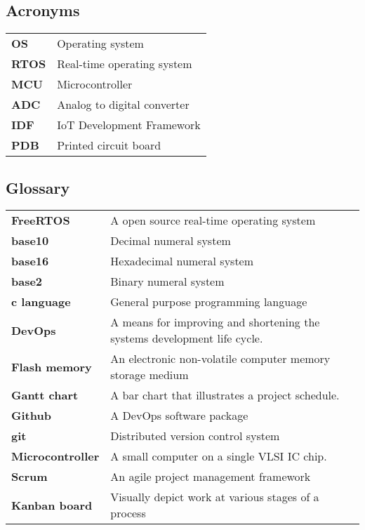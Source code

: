 \documentclass[../report.tex]{subfiles}
\begin{document}
\subsection{Acronyms}
\begin{table}[H]
    \begin{center}
        \begin{tabularx}{\linewidth}{l L}
            \textbf{OS} & Operating system\\
            \textbf{RTOS} & Real-time operating system\\
            \textbf{MCU} & Microcontroller\\
            \textbf{ADC} & Analog to digital converter\\
            \textbf{IDF} & IoT Development Framework\\
            \textbf{PDB} & Printed circuit board
        \end{tabularx}
    \end{center}
\end{table}
\subsection{Glossary}
\begin{table}[H]
    \begin{center}
        \begin{tabularx}{\linewidth}{l L}
            \textbf{FreeRTOS} & A open source real-time operating system \\
            \textbf{base10} & Decimal numeral system \\
            \textbf{base16} & Hexadecimal numeral system \\
            \textbf{base2} & Binary numeral system \\
            \textbf{c language} & General purpose programming language \\
            \textbf{DevOps} & A means for improving and shortening the systems development life cycle. \\
            \textbf{Flash memory} & An electronic non-volatile computer memory storage medium \\
            \textbf{Gantt chart} & A bar chart that illustrates a project schedule. \\
            \textbf{Github} & A DevOps software package \\
            \textbf{git} & Distributed version control system \\
            \textbf{Microcontroller} & A small computer on a single VLSI IC chip. \\
            \textbf{Scrum} & An agile project management framework \\
            \textbf{Kanban board} & Visually depict work at various stages of a process\\
        \end{tabularx}
    \end{center}
\end{table}
\end{document}
